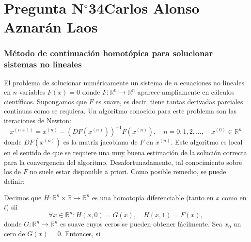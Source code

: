 \section{Pregunta N$^{\circ}$34\qquad Carlos Alonso Aznarán Laos}

\begin{frame}
	\frametitle{
		Método de continuación homotópica para solucionar sistemas no
		lineales
	}

	El problema de solucionar numéricamente un sistema de $n$
	ecuaciones no lineales en $n$ variables $F\left(x\right)=0$
	donde
	\begin{math}
		F\colon\mathbb{R}^{n}\to\mathbb{R}^{n}
	\end{math}
	aparece ampliamente en cálculos científicos.
	Supongamos que $F$ es suave, es decir, tiene tantas derivadas
	parciales continuas como se requiera.
	Un algoritmo conocido para este problema son las
	\alert{iteraciones de Newton}:
	\begin{equation*}
		x^{\left(n+1\right)}=
		x^{\left(n\right)}-
		{\left(DF\left(x^{\left(n\right)}\right)\right)}^{-1}
		F\left(x^{\left(n\right)}\right),\quad
		n=0,1,2,\dotsc,\quad
		x^{\left(0\right)}\in\mathbb{R}^{n}
	\end{equation*}
	donde
	\begin{math}
		DF\left(x^{\left(n\right)}\right)
	\end{math}
	es la matriz jacobiana de $F$ en $x^{\left(n\right)}$.
	Este algoritmo es \alert{local} en el sentido de que se requiere
	una muy buena estimación de la solución correcta para la
	convergencia del algoritmo.
	Desafortunadamente, tal conocimiento sobre los de $F$ no suele
	estar disponible a priori.
	Como posible remedio, se puede definir:

	\begin{definition}
		Decimos que
		\begin{math}
			H\colon
			\mathbb{R}^{n}\times\mathbb{R}\to
			\mathbb{R}^{n}
		\end{math}
		es una \alert{homotopía diferenciable} (tanto en $x$ como en $t$)
		sii
		\begin{equation*}
			\forall x\in\mathbb{R}^{n}:
			H\left(x,0\right)=
			G\left(x\right),\quad
			H\left(x,1\right)=
			F\left(x\right),
		\end{equation*}
		donde
		\begin{math}
			G\colon\mathbb{R}^{n}\to\mathbb{R}^{n}
		\end{math}
		es suave cuyos ceros se pueden obtener fácilmente.
		Sea $x_{0}$ un cero de $G\left(x\right)=0$.
		Entonces, si
	\end{definition}


\end{frame}
